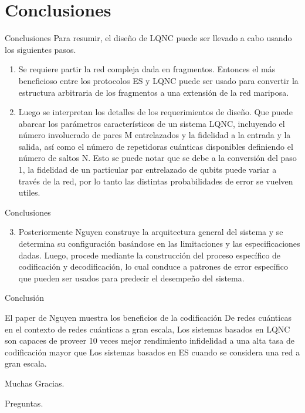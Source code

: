 \documentclass[10pt]{beamer}
\renewenvironment{alertblock}[1]
    {\begin{oldalertblock}{#1}
        \smallskip
    }
    {
    \end{oldalertblock}
    }
\begin{document}
\section{Conclusiones}

\begin{frame}{Conclusiones}
  Para resumir, el diseño de LQNC puede ser llevado a cabo usando los siguientes pasos.
  \begin{enumerate}
    \setcounter{enumi}{0}
    \item Se requiere partir la red compleja dada en fragmentos. Entonces el más beneficioso entre los protocolos ES y LQNC puede ser usado para convertir la estructura arbitraria de los fragmentos a una extensión de la red mariposa.
    
    \item Luego se interpretan los detalles de los requerimientos de diseño. Que puede abarcar los parámetros característicos de un sistema LQNC, incluyendo el número involucrado de pares M entrelazados y la fidelidad a la entrada y la salida, así como el número de repetidoras cuánticas disponibles definiendo el número de saltos N. Esto se puede notar que se debe a la conversión del paso 1, la fidelidad de un particular par entrelazado de qubits puede variar a través de la red, por lo tanto las distintas probabilidades de error se vuelven utiles.

  \end{enumerate}
\end{frame}

\begin{frame}{Conclusiones}
  \begin{enumerate}
    \setcounter{enumi}{2}
    \item Posteriormente Nguyen construye la arquitectura general del sistema y se determina su configuración basándose en las limitaciones y las especificaciones dadas. Luego, procede mediante la construcción del proceso específico de codificación y decodificación, lo cual conduce a patrones de error específico que pueden ser usados para predecir el desempeño del sistema.
  \end{enumerate}
\end{frame}

  \begin{frame} 
    \begin{alertblock}{Conclusión}
      El paper de Nguyen muestra los beneficios de la codificación De redes cuánticas en el contexto de redes cuánticas a gran escala, Los sistemas basados en LQNC  son capaces de proveer 10 veces mejor rendimiento infidelidad a una alta tasa de codificación mayor que Los sistemas basados en ES cuando se considera una red a gran escala.
    \end{alertblock}
  \end{frame}

\begin{frame}[standout]
  Muchas Gracias.
\end{frame}


{
\begin{frame}[standout]
  Preguntas.
\end{frame}
}
\end{document}
